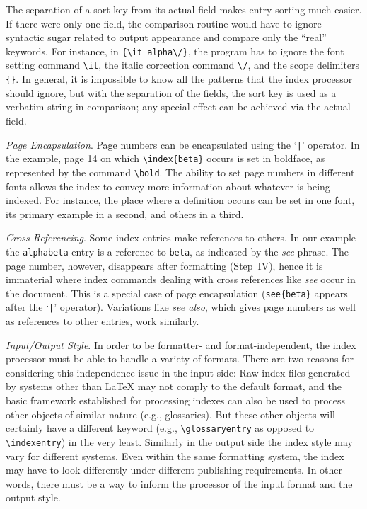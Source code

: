 The separation of a sort key from its actual field makes entry sorting
much easier.  If there were only one field,
the comparison routine would have to ignore syntactic sugar related to
output appearance and compare only the ``real'' keywords.
For instance, in \verb|{\it alpha\/}|, the program has to ignore the font
setting command \verb|\it|, the italic correction command \verb|\/|,
and the scope delimiters \verb|{}|.
In general, it is impossible to know
all the patterns that the index processor should ignore,
but with the separation of the fields, the sort key is used as a verbatim string
in comparison; any special effect can be achieved via the actual field.

{\it Page Encapsulation\/}.  Page numbers can be encapsulated
using the `\verb#|#' operator.  In the example,
page 14 on which \verb|\index{beta}| occurs is set in boldface, as
represented by the command \verb|\bold|.  The ability to set
page numbers in different fonts allows the index to convey
more information about whatever is being indexed.  For instance,
the place where a definition occurs can be set in one font, its
primary example in a second, and others in a third.

{\it Cross Referencing\/}.  Some index entries make references to
others.  In our example the \verb|alphabeta| entry is a reference
to \verb|beta|, as indicated by the {\it see\/} phrase.
The page number, however, disappears after formatting (Step~IV),
hence it is immaterial where index commands dealing with cross references
like {\it see\/} occur in the document.
This is a special case of page encapsulation (\verb|see{beta}| appears
after the `\verb#|#' operator).
Variations like {\it see also\/}, which gives page numbers as well
as references to other entries, work similarly.

{\it Input/Output Style\/}.  In order to be
formatter- and format-independent, the index processor must be able
to handle a variety of formats.  There are two reasons for considering
this independence issue in the input side:
Raw index files generated by systems
other than {\LaTeX} may not comply to the default format, and
the basic framework established for processing indexes can also be
used to process other objects of similar nature (e.g., glossaries).
But these other objects will certainly have a different keyword
(e.g., \verb|\glossaryentry| as opposed to \verb|\indexentry|)
in the very least.
Similarly in the output side the index style
may vary for different systems.  Even within the same formatting
system, the index may have to look differently under different
publishing requirements.   In other words, there must be a way to inform
the processor of the input format and the output style.


